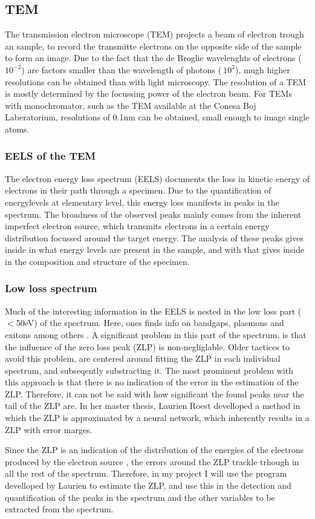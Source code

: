 \subsection{TEM} %
\label{ssub:tem}
The transmission electron microscope (TEM) projects a beam of electron trough an sample, to record the transmitte electrons on the opposite side of the sample to form an image. Due to the fact that the de Broglie wavelenghts of electrons (~$10^{-2}$) are factors smaller than the wavelength of photons ($~10^2$), mugh higher resolutions can be obtained than with light microscopy. \cite{reimer_1989} The resolution of a TEM is mostly determined by the focussing power of the electron beam. For TEMs with monochromator, such as the TEM available at the Conesa Boj Laberatorium, resolutions of 0.1nm can be obtained, small enough to image single atoms. \cite{egerton_article}




\subsubsection{EELS of the TEM}
The electron energy loss spectrum (EELS) documents the loss in kinetic energy of electrons in their path through a specimen. Due to the quantification of energylevels at elementary level, this energy loss manifests in peaks in the spectrum. The broadness of the observed peaks mainly comes from the inherent imperfect electron source, which transmits electrons in a certain energy distribution focussed around the target energy. The analysis of these peaks gives inside in what energy levels are present in the sample, and with that gives inside in the composition and structure of the specimen. \cite{egerton_article}




\subsubsection{Low loss spectrum}
Much of the interesting information in the EELS is nested in the low loss part ($<$50eV) of the spectrum. Here, ones finds info on bandgaps, plasmons and exitons among others \cite{egerton_book}. A significant problem in this part of the spectrum, is that the influence of the zero loss peak (ZLP) is non-negliglable. Older tactices to avoid this problem, are centered around fitting the ZLP in each individual spectrum, and subseqently substracting it. The most prominent problem with this approach is that there is no indication of the error in the estimation of the ZLP. Therefore, it can not be said with how significant the found peaks near the tail of the ZLP are. In her master thesis, Laurien Roest develloped a method in which the ZLP is approximated by a neural network, which inherently results in a ZLP with error marges. 

Since the ZLP is an indication of the distribution of the energies of the electrons produced by the electron source \cite{egerton_article}, the errors around the ZLP trackle trhough in all the rest of the spectrum. Therefore, in my project I will use the program develloped by Laurien to estimate the ZLP, and use this in the detection and quantification of the peaks in the spectrum and the other variables to be extracted from the spectrum.